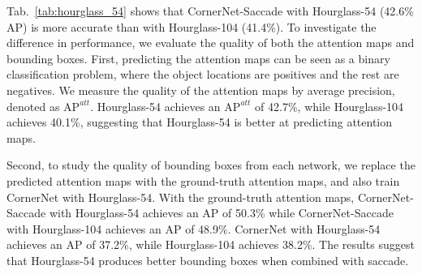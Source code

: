 \documentclass{bmvc2k}
\begin{document}
\begin{table}[h]
    \centering
    \caption{Hourglass-54 produces better results when combined with saccade on the COCO validation set.}
    \label{tab:hourglass_54}
\end{table}

Tab.~\ref{tab:hourglass_54} shows that CornerNet-Saccade with Hourglass-54 (42.6\% AP) is more accurate than with Hourglass-104 (41.4\%). To investigate the difference in performance, we evaluate the quality of both the attention maps and bounding boxes. First, predicting the attention maps can be seen as a binary classification problem, where the object locations are positives and the rest are negatives. We measure the quality of the attention maps by average precision, denoted as $\text{AP}^{att}$. Hourglass-54 achieves an $\text{AP}^{att}$ of 42.7\%, while Hourglass-104 achieves 40.1\%, suggesting that Hourglass-54 is better at predicting attention maps. 

Second, to study the quality of bounding boxes from each network, we replace the predicted attention maps with the ground-truth attention maps, and also train CornerNet with Hourglass-54. With the ground-truth attention maps, CornerNet-Saccade with Hourglass-54 achieves an AP of 50.3\% while CornerNet-Saccade with Hourglass-104 achieves an AP of 48.9\%. CornerNet with Hourglass-54 achieves an AP of 37.2\%, while Hourglass-104 achieves 38.2\%. The results suggest that Hourglass-54 produces better bounding boxes when combined with saccade.
\end{document}
